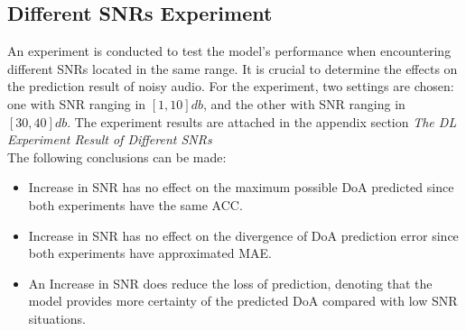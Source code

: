 \subsection*{Different SNRs Experiment}
An experiment is conducted to test the model's performance when encountering different SNRs located in the same range. It is crucial to determine the effects on the prediction result of noisy audio. For the experiment, two settings are chosen: one with SNR ranging in \([1,10]db\), and the other with SNR ranging in \([30, 40]db\). The experiment results are attached in the appendix section \textit{The DL Experiment Result of Different SNRs}\\
The following conclusions can be made:
\begin{itemize}
    \item Increase in SNR has no effect on the maximum possible DoA predicted since both experiments have the same ACC.
    \item Increase in SNR has no effect on the divergence of DoA prediction error since both experiments have approximated MAE.
    \item An Increase in SNR does reduce the loss of prediction, denoting that the model provides more certainty of the predicted DoA compared with low SNR situations.
\end{itemize}



